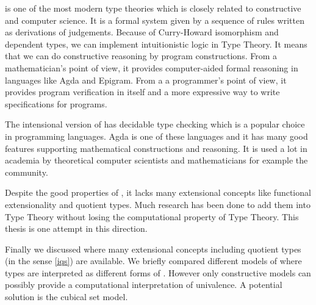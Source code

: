 \mltt is one of the most modern type theories which is closely related to constructive \maths and computer science. It is a formal system given by a sequence of rules written as derivations of judgements. Because of Curry-Howard isomorphism and dependent types, we can implement intuitionistic logic in Type Theory. It means that we can do constructive reasoning by program constructions. From a mathematician's point of view, it provides computer-aided formal reasoning in languages like Agda and Epigram. From a a programmer's point of view, it provides program verification in itself and a more expressive way to write specifications for programs.

The intensional version of \mltt has decidable type checking which is a popular choice in programming languages. Agda is one of these languages and it has many good features supporting mathematical constructions and reasoning. It is used a lot in academia by theoretical computer scientists and mathematicians for example the \hott community. 

Despite the good properties of \itt, it lacks many extensional concepts like functional extensionality and quotient types. Much research has been done to add them into Type Theory without losing the computational property of Type Theory. This thesis is one attempt in this direction.

Finally we discussed \hott where many extensional concepts including quotient types (in the sense \autoref{iqs}) are available. 
We briefly compared different models of \hott where types are interpreted as different forms of \wog. However only constructive models can possibly provide a computational interpretation of univalence.
A potential solution is the cubical set model.







